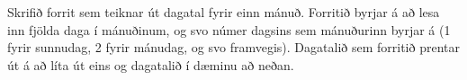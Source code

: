 \begin{problem}
	Skrifið forrit sem teiknar út dagatal fyrir einn mánuð. Forritið byrjar á að lesa inn fjölda daga í mánuðinum, og svo númer dagsins sem mánuðurinn byrjar á (1 fyrir sunnudag, 2 fyrir mánudag, og svo framvegis). Dagatalið sem forritið prentar út á að líta út eins og dagatalið í dæminu að neðan.

\begin{example}
%
\end{example}
\end{problem}